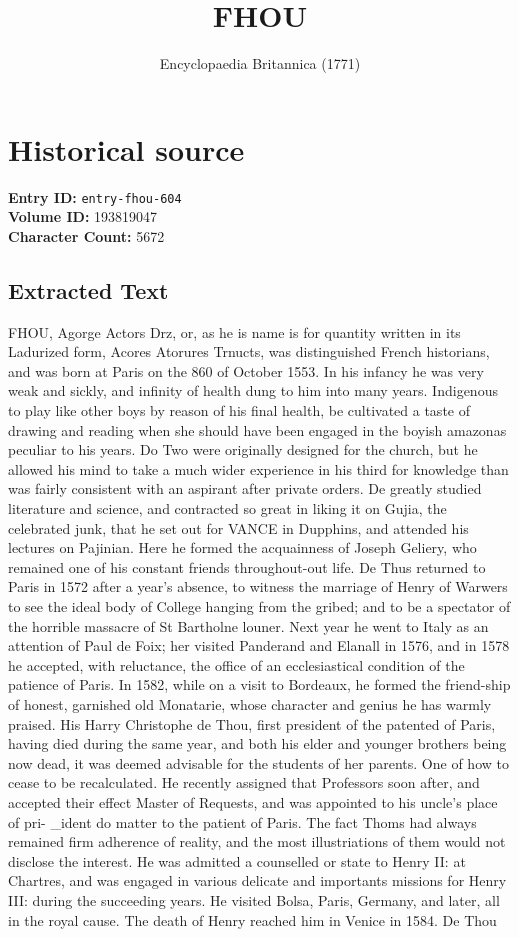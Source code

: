 \documentclass{article}
\title{FHOU}
\date{Encyclopaedia Britannica (1771)}
\begin{document}
\maketitle

\section*{Historical source}
\textbf{Entry ID:} \texttt{entry-fhou-604} \\
\textbf{Volume ID:} 193819047 \\
\textbf{Character Count:} 5672

\subsection*{Extracted Text}
FHOU, Agorge Actors Drz, or, as he is name is for quantity written in its Ladurized form, Acores Atorures Trnucts, was distinguished French historians, and was born at Paris on the 860 of October 1553. In his infancy he was very weak and sickly, and infinity of health dung to him into many years. Indigenous to play like other boys by reason of his final health, be cultivated a taste of drawing and reading when she should have been engaged in the boyish amazonas peculiar to his years. Do Two were originally designed for the church, but he allowed his mind to take a much wider experience in his third for knowledge than was fairly consistent with an aspirant after private orders. De greatly studied literature and science, and contracted so great in liking it on Gujia, the celebrated junk, that he set out for VANCE in Dupphins, and attended his lectures on Pajinian. Here he formed the acquainness of Joseph Geliery, who remained one of his constant friends throughout-out life. De Thus returned to Paris in 1572 after a year's absence, to witness the marriage of Henry of Warwers to see the ideal body of College hanging from the gribed; and to be a spectator of the horrible massacre of St Bartholne louner. Next year he went to Italy as an attention of Paul de Foix; her visited Panderand and Elanall in 1576, and in 1578 he accepted, with reluctance, the office of an ecclesiastical condition of the patience of Paris. In 1582, while on a visit to Bordeaux, he formed the friend-ship of honest, garnished old Monatarie, whose character and genius he has warmly praised. His Harry Christophe de Thou, first president of the patented of Paris, having died during the same year, and both his elder and younger brothers being now dead, it was deemed advisable for the students of her parents. One of how to cease to be recalculated. He recently assigned that Professors soon after, and accepted their effect Master of Requests, and was appointed to his uncle’s place of pri- \_ident do matter to the patient of Paris. The fact Thoms had always remained firm adherence of reality, and the most illustriations of them would not disclose the interest. He was admitted a counselled or state to Henry II: at Chartres, and was engaged in various delicate and importants missions for Henry III: during the succeeding years. He visited Bolsa, Paris, Germany, and later, all in the royal cause. The death of Henry reached him in Venice in 1584. De Thou 
\end{document}
